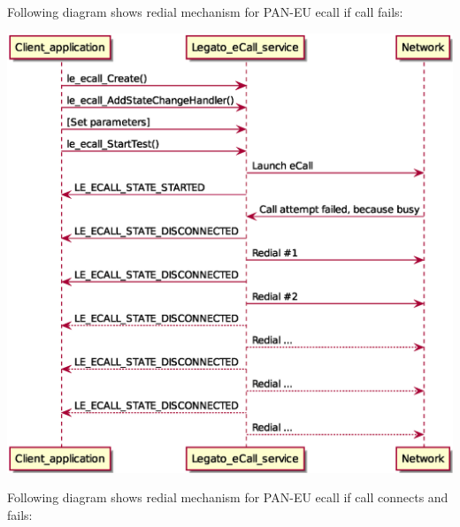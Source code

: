Following diagram shows redial mechanism for P\+A\+N-\/\+EU ecall if call fails\+:


\begin{DoxyImageNoCaption}
  \mbox{\includegraphics[width=\textwidth,height=\textheight/2,keepaspectratio=true]{PanEU_eCall_and_callFails}}
\end{DoxyImageNoCaption}


Following diagram shows redial mechanism for P\+A\+N-\/\+EU ecall if call connects and fails\+:


